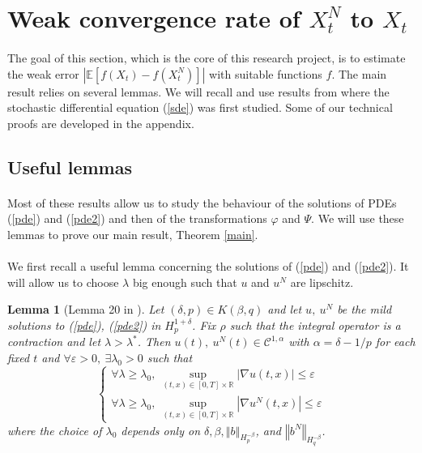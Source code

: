 \documentclass[11pt]{enstaPRE}
\newtheorem{lem}[theo]{Lemma}
\newcommand{\norme}[1]{\left\Vert #1\right\Vert}
\newcommand{\R}{\mathbb{R}}
\newcommand{\E}{\mathbb{E}}
\begin{document}
\section{Weak convergence rate of $X^{N}_t$ to $X_t$}
\paragraph{}
The goal of this section, which is the core of this research project, is to estimate the weak error $\left|\E\left[f\left(X_t\right)-f\left(X_t^N\right)\right]\right|$ with suitable functions $f$. The main result relies on several lemmas. We will recall and use results from \cite{Fla-Iss-Rus-2017} where the stochastic differential equation (\ref{sde}) was first studied. Some of our technical proofs are developed in the appendix.

\subsection{Useful lemmas}

\paragraph{}      
Most of these results allow us to study the behaviour of the solutions of PDEs (\ref{pde}) and (\ref{pde2}) and then of the transformations $\varphi$ and $\Psi$. We will use these lemmas to prove our main result, Theorem \ref{main}. 

\paragraph{}
We first recall a useful lemma concerning the solutions of (\ref{pde}) and (\ref{pde2}). It will allow us to choose $\lambda$ big enough such that $u$ and $u^N$ are lipschitz.

\begin{lem}[Lemma 20 in \cite{Fla-Iss-Rus-2017}]\label{lem}
    Let $(\delta,p)\in K(\beta,q)$ and let $u,\ u^N$ be the mild solutions to (\ref{pde}), (\ref{pde2}) in $H_p^{1+\delta}$. Fix $\rho$ such that the integral operator is a contraction and let $\lambda>\lambda^*$. Then $u(t),\ u^N(t)\in\mathcal{C}^{1,\alpha}$ with $\alpha=\delta-1/p$ for each fixed $t$ and $\forall\varepsilon>0,\ \exists\lambda_0>0$ such that
    \begin{equation*}
    \begin{cases}\forall\lambda\geq\lambda_0,\
    \underset{(t,x)\in[0,T]\times\R}{\sup} |\nabla u(t,x)| \leq\varepsilon  \\ \forall\lambda\geq\lambda_0,\
    \underset{(t,x)\in[0,T]\times\R}{\sup} |\nabla u^N(t,x)| \leq\varepsilon
    \end{cases}
    \end{equation*}
    where the choice of $\lambda_0$ depends only on $\delta,\beta,\norme{b}_{H_p^{-\beta}}$, and $\norme{b^N}_{H_q^{-\beta}}$.
\end{lem}
\end{document}
